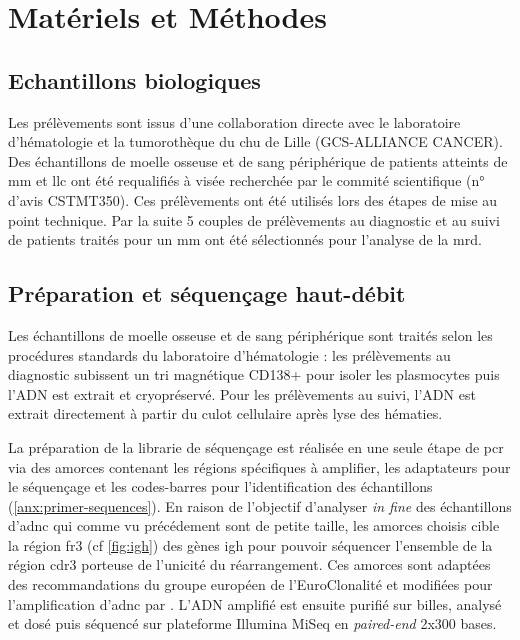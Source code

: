 \chapter{Matériels et Méthodes}

\section{Echantillons biologiques}

Les prélèvements sont issus d'une collaboration directe avec le laboratoire d'hématologie et la tumorothèque du 
\gls{chu} de Lille (GCS-ALLIANCE CANCER). Des échantillons de moelle osseuse et de sang périphérique de patients 
atteints de \gls{mm} et \gls{llc} ont été requalifiés à visée recherchée par le commité scientifique (n° d'avis CSTMT350). 
Ces prélèvements ont été utilisés lors des étapes de mise au point technique. Par la suite 5 couples de prélèvements 
au diagnostic et au suivi de patients traités pour un \gls{mm} ont été sélectionnés pour l'analyse de la \gls{mrd}.

\section{Préparation et séquençage haut-débit}

Les échantillons de moelle osseuse et de sang périphérique sont traités selon les procédures standards du laboratoire 
d'hématologie : les prélèvements au diagnostic subissent un tri magnétique CD138+ pour isoler les plasmocytes puis l'ADN 
est extrait et cryopréservé. Pour les prélèvements au suivi, l'ADN est extrait directement à partir du culot cellulaire 
après lyse des hématies.

La préparation de la librarie de séquençage est réalisée en une seule étape de \gls{pcr} via des amorces contenant les 
régions spécifiques à amplifier, les adaptateurs pour le séquençage et les codes-barres pour l'identification des échantillons 
(\autoref{anx:primer-sequences}).
En raison de l'objectif d'analyser \textit{in fine} des échantillons d'\gls{adnc} qui comme vu précédement sont de petite taille, 
les amorces choisis cible la région \gls{fr}3 (cf \autoref{fig:igh}) des gènes \gls{igh} pour pouvoir séquencer l'ensemble de la 
région \gls{cdr}3 porteuse de l'unicité du réarrangement. 
Ces amorces sont adaptées des recommandations du groupe européen de l'EuroClonalité \cite{langerakEuroClonalityBIOMED2Guidelines2012} 
et modifiées pour l'amplification d'\gls{adnc} par \citeauthor{pottCfDNABasedNGSIG2022a} \cite{pottCfDNABasedNGSIG2022a}.
L'ADN amplifié est ensuite purifié sur billes, analysé et dosé puis séquencé sur plateforme Illumina MiSeq en \textit{paired-end} 2x300 bases.


